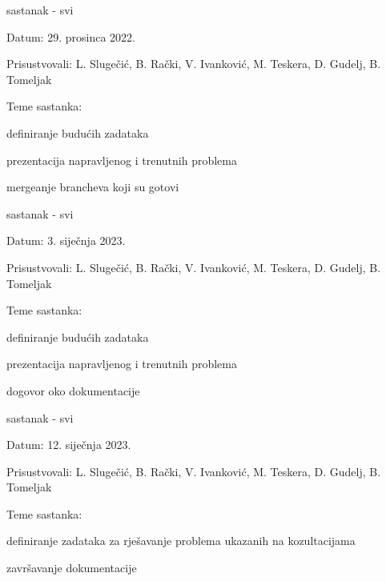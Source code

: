 \begin{packed_enum}
\begin{packed_item}
\begin{packed_item}
				\end{packed_item}
			\end{packed_item}
			
			\item  sastanak - svi
			\item[] \begin{packed_item}
				\item Datum: 29. prosinca 2022.
				\item Prisustvovali: 
                L. Slugečić, B. Rački, V. Ivanković, M. Teskera, D. Gudelj, B. Tomeljak
				\item Teme sastanka:
				\begin{packed_item}
					\item 
                    definiranje budućih zadataka
                    \item
                    prezentacija napravljenog i trenutnih problema
                    \item
                    mergeanje brancheva koji su gotovi
                    
				
				\end{packed_item}
			\end{packed_item}
			
			\item  sastanak - svi
			\item[] \begin{packed_item}
				\item Datum: 3. siječnja 2023.
				\item Prisustvovali: 
                L. Slugečić, B. Rački, V. Ivanković, M. Teskera, D. Gudelj, B. Tomeljak
				\item Teme sastanka:
				\begin{packed_item}
					\item 
                    definiranje budućih zadataka
                    \item
                    prezentacija napravljenog i trenutnih problema
                    \item
                    dogovor oko dokumentacije
                    
				
				\end{packed_item}
			\end{packed_item}
			
			\item  sastanak - svi
			\item[] \begin{packed_item}
				\item Datum: 12. siječnja 2023.
				\item Prisustvovali: 
                L. Slugečić, B. Rački, V. Ivanković, M. Teskera, D. Gudelj, B. Tomeljak
				\item Teme sastanka:
				\begin{packed_item}
					\item 
                    definiranje zadataka za rješavanje problema ukazanih na kozultacijama
                    \item
                    završavanje dokumentacije
                    

\end{packed_item}
\end{packed_item}
\end{packed_enum}
